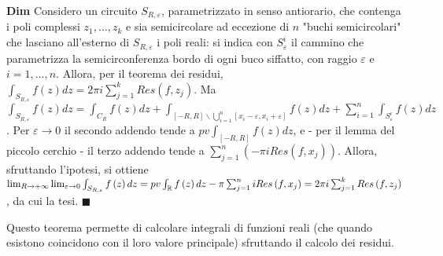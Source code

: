 \documentclass{article}
\begin{document}
\textbf{Dim} Considero un circuito $S_{R,\varepsilon }$, parametrizzato in
senso antiorario, che contenga i poli complessi $z_{1},...,z_{k}$ e sia
semicircolare ad eccezione di $n$ "buchi semicircolari" che lasciano
all'esterno di $S_{R,\varepsilon }$ i poli reali: si indica con $%
S_{\varepsilon }^{i}$ il cammino che parametrizza la semicirconferenza bordo
di ogni buco siffatto, con raggio $\varepsilon $ e $i=1,...,n$. Allora, per
il teorema dei residui, $\int_{S_{R,\varepsilon }}f\left( z\right) dz=2\pi
i\sum_{j=1}^{k}Res\left( f,z_{j}\right) $. Ma $\int_{S_{R,\varepsilon
}}f\left( z\right) dz=\int_{C_{R}}f\left( z\right) dz+\int_{\left[ -R,R%
\right] \backslash \bigcup_{i=1}^{n}\left[ x_{i}-\varepsilon
,x_{i}+\varepsilon \right] }f\left( z\right)
dz+\sum_{i=1}^{n}\int_{S_{\varepsilon }^{i}}f\left( z\right) dz$. Per $%
\varepsilon \rightarrow 0$ il secondo addendo tende a $pv\int_{\left[ -R,R%
\right] }f\left( z\right) dz$, e - per il lemma del piccolo cerchio - il
terzo addendo tende a $\sum_{j=1}^{n}\left( -\pi iRes\left( f,x_{j}\right)
\right) $. Allora, sfruttando l'ipotesi, si ottiene $\lim_{R\rightarrow
+\infty }\lim_{\varepsilon \rightarrow 0}\int_{S_{R,\varepsilon }}f\left(
z\right) dz=pv\int_{%
\mathbb{R}
}f\left( z\right) dz-\pi \sum_{j=1}^{n}iRes\left( f,x_{j}\right) =2\pi
i\sum_{j=1}^{k}Res\left( f,z_{j}\right) $, da cui la tesi. $\blacksquare $

Questo teorema permette di calcolare integrali di funzioni reali (che quando
esistono coincidono con il loro valore principale) sfruttando il calcolo dei
residui.
\end{document}
